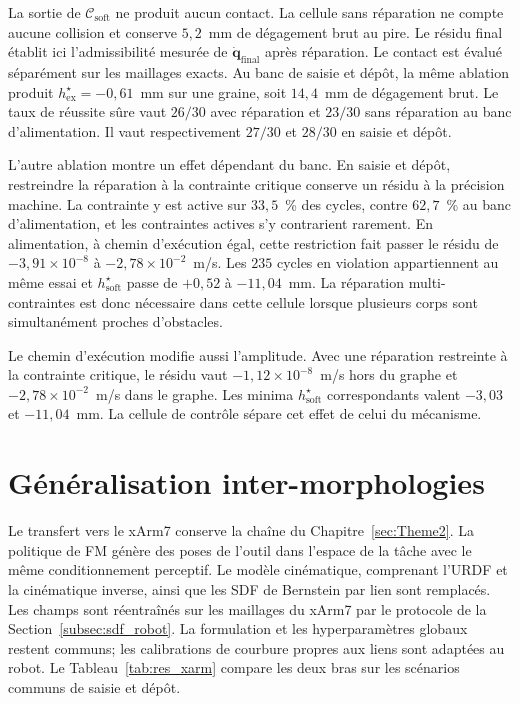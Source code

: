 La sortie de $\mathcal{C}_{\mathrm{soft}}$ ne produit aucun contact. La cellule sans réparation ne compte aucune collision et conserve $5{,}2$~mm de dégagement brut au pire. Le résidu final établit ici l'admissibilité mesurée de $\dot{\mathbf{q}}_{\mathrm{final}}$ après réparation. Le contact est évalué séparément sur les maillages exacts. Au banc de saisie et dépôt, la même ablation produit $h_{\mathrm{ex}}^{\star}=-0{,}61$~mm sur une graine, soit $14{,}4$~mm de dégagement brut. Le taux de réussite sûre vaut $26/30$ avec réparation et $23/30$ sans réparation au banc d'alimentation. Il vaut respectivement $27/30$ et $28/30$ en saisie et dépôt.

L'autre ablation montre un effet dépendant du banc. En saisie et dépôt, restreindre la réparation à la contrainte critique conserve un résidu à la précision machine. La contrainte y est active sur $33{,}5$~\% des cycles, contre $62{,}7$~\% au banc d'alimentation, et les contraintes actives s'y contrarient rarement. En alimentation, à chemin d'exécution égal, cette restriction fait passer le résidu de $-3{,}91\times10^{-8}$ à $-2{,}78\times10^{-2}$~m/s. Les $235$ cycles en violation appartiennent au même essai et $h_{\mathrm{soft}}^{\star}$ passe de $+0{,}52$ à $-11{,}04$~mm. La réparation multi-contraintes est donc nécessaire dans cette cellule lorsque plusieurs corps sont simultanément proches d'obstacles.

Le chemin d'exécution modifie aussi l'amplitude. Avec une réparation restreinte à la contrainte critique, le résidu vaut $-1{,}12\times10^{-8}$~m/s hors du graphe et $-2{,}78\times10^{-2}$~m/s dans le graphe. Les minima $h_{\mathrm{soft}}^{\star}$ correspondants valent $-3{,}03$ et $-11{,}04$~mm. La cellule de contrôle sépare cet effet de celui du mécanisme.

\FloatBarrier

\section{Généralisation inter-morphologies}\label{sec:res_xarm}
Le transfert vers le xArm7 conserve la chaîne du Chapitre~\ref{sec:Theme2}. La politique de \ac{FM} génère des poses de l'outil dans l'espace de la tâche avec le même conditionnement perceptif. Le modèle cinématique, comprenant l'\ac{URDF} et la cinématique inverse, ainsi que les \ac{SDF} de Bernstein par lien sont remplacés. Les champs sont réentraînés sur les maillages du xArm7 par le protocole de la Section~\ref{subsec:sdf_robot}. La formulation et les hyperparamètres globaux restent communs; les calibrations de courbure propres aux liens sont adaptées au robot. Le Tableau~\ref{tab:res_xarm} compare les deux bras sur les scénarios communs de saisie et dépôt.


